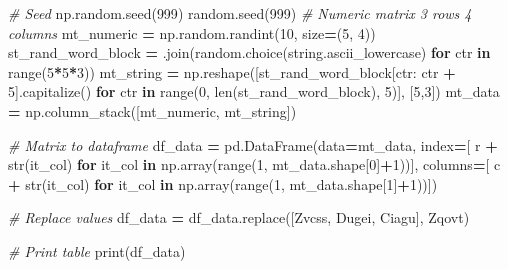 \documentclass[
]{book}
\newenvironment{Shaded}{\begin{snugshade}}{\end{snugshade}}
\newcommand{\BuiltInTok}[1]{#1}
\newcommand{\CommentTok}[1]{\textcolor[rgb]{0.56,0.35,0.01}{\textit{#1}}}
\newcommand{\ControlFlowTok}[1]{\textcolor[rgb]{0.13,0.29,0.53}{\textbf{#1}}}
\newcommand{\DecValTok}[1]{\textcolor[rgb]{0.00,0.00,0.81}{#1}}
\newcommand{\KeywordTok}[1]{\textcolor[rgb]{0.13,0.29,0.53}{\textbf{#1}}}
\newcommand{\NormalTok}[1]{#1}
\newcommand{\OperatorTok}[1]{\textcolor[rgb]{0.81,0.36,0.00}{\textbf{#1}}}
\newcommand{\StringTok}[1]{\textcolor[rgb]{0.31,0.60,0.02}{#1}}
\begin{document}
\begin{Shaded}
\begin{Highlighting}[]
\CommentTok{\# Seed}
\NormalTok{np.random.seed(}\DecValTok{999}\NormalTok{)}
\NormalTok{random.seed(}\DecValTok{999}\NormalTok{)}
\CommentTok{\# Numeric matrix 3 rows 4 columns}
\NormalTok{mt\_numeric }\OperatorTok{=}\NormalTok{ np.random.randint(}\DecValTok{10}\NormalTok{, size}\OperatorTok{=}\NormalTok{(}\DecValTok{5}\NormalTok{, }\DecValTok{4}\NormalTok{))}
\NormalTok{st\_rand\_word\_block }\OperatorTok{=} \StringTok{\textquotesingle{}\textquotesingle{}}\NormalTok{.join(random.choice(string.ascii\_lowercase) }\ControlFlowTok{for}\NormalTok{ ctr }\KeywordTok{in} \BuiltInTok{range}\NormalTok{(}\DecValTok{5}\OperatorTok{*}\DecValTok{5}\OperatorTok{*}\DecValTok{3}\NormalTok{))}
\NormalTok{mt\_string }\OperatorTok{=}\NormalTok{ np.reshape([st\_rand\_word\_block[ctr: ctr }\OperatorTok{+} \DecValTok{5}\NormalTok{].capitalize() }\ControlFlowTok{for}\NormalTok{ ctr }\KeywordTok{in} \BuiltInTok{range}\NormalTok{(}\DecValTok{0}\NormalTok{, }\BuiltInTok{len}\NormalTok{(st\_rand\_word\_block), }\DecValTok{5}\NormalTok{)], [}\DecValTok{5}\NormalTok{,}\DecValTok{3}\NormalTok{])}
\NormalTok{mt\_data }\OperatorTok{=}\NormalTok{ np.column\_stack([mt\_numeric, mt\_string])}

\CommentTok{\# Matrix to dataframe}
\NormalTok{df\_data }\OperatorTok{=}\NormalTok{ pd.DataFrame(data}\OperatorTok{=}\NormalTok{mt\_data,}
\NormalTok{                       index}\OperatorTok{=}\NormalTok{[ }\StringTok{\textquotesingle{}r\textquotesingle{}} \OperatorTok{+} \BuiltInTok{str}\NormalTok{(it\_col) }\ControlFlowTok{for}\NormalTok{ it\_col }\KeywordTok{in}\NormalTok{ np.array(}\BuiltInTok{range}\NormalTok{(}\DecValTok{1}\NormalTok{, mt\_data.shape[}\DecValTok{0}\NormalTok{]}\OperatorTok{+}\DecValTok{1}\NormalTok{))],}
\NormalTok{                       columns}\OperatorTok{=}\NormalTok{[ }\StringTok{\textquotesingle{}c\textquotesingle{}} \OperatorTok{+} \BuiltInTok{str}\NormalTok{(it\_col) }\ControlFlowTok{for}\NormalTok{ it\_col }\KeywordTok{in}\NormalTok{ np.array(}\BuiltInTok{range}\NormalTok{(}\DecValTok{1}\NormalTok{, mt\_data.shape[}\DecValTok{1}\NormalTok{]}\OperatorTok{+}\DecValTok{1}\NormalTok{))])}

\CommentTok{\# Replace values}
\NormalTok{df\_data }\OperatorTok{=}\NormalTok{ df\_data.replace([}\StringTok{\textquotesingle{}Zvcss\textquotesingle{}}\NormalTok{, }\StringTok{\textquotesingle{}Dugei\textquotesingle{}}\NormalTok{, }\StringTok{\textquotesingle{}Ciagu\textquotesingle{}}\NormalTok{], }\StringTok{\textquotesingle{}Zqovt\textquotesingle{}}\NormalTok{)}

\CommentTok{\# Print table}
\BuiltInTok{print}\NormalTok{(df\_data)}
\end{Highlighting}
\end{Shaded}
\end{document}
